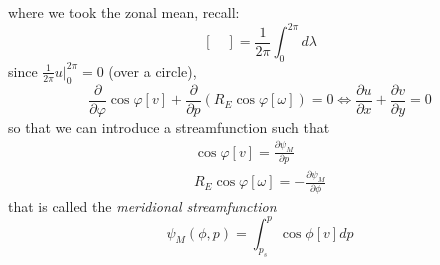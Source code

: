 where we took the zonal mean, recall:
\[\left[\quad\right]=\frac{1}{2\pi}\int_0^{2\pi}d\lambda\]
since $\displaystyle \frac{1}{2\pi} u\big|_0^{2\pi}=0$ (over a circle), 
\[\frac{\partial}{\partial\varphi}\cos\varphi[v]+\frac{\partial}{\partial p}\left(R_E\cos\varphi[\omega]\right)=0\Leftrightarrow \frac{\partial u}{\partial x}+\frac{\partial v}{\partial y}=0\]
so that we can introduce a streamfunction such that 
\begin{align*}
    \cos\varphi[v]=\frac{\partial\psi_M}{\partial p}\\
    R_E\cos\varphi[\omega]=-\frac{\partial\psi_M}{\partial\phi}
\end{align*}
that is called the \emph{meridional streamfunction}
\begin{equation}\label{eq.meridional streamfunction}
    \psi_M(\phi,p)=\int_{p_s}^p\cos\phi[v]dp
\end{equation}

